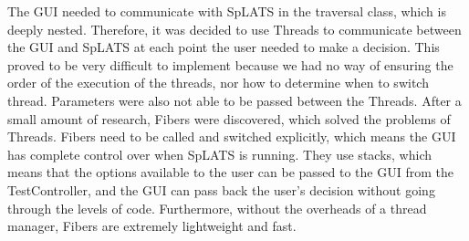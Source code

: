     The GUI needed to communicate with SpLATS in the traversal class, which is deeply nested. Therefore, it was decided to use Threads to communicate between the GUI and SpLATS at each point the user needed to make a decision. This proved to be very difficult to implement because we had no way of ensuring the order of the execution of the threads, nor how to determine when to switch thread. Parameters were also not able to be passed between the Threads. After a small amount of research, Fibers were discovered, which solved the problems of Threads. Fibers need to be called and switched explicitly, which means the GUI has complete control over when SpLATS is running. They use stacks, which means that the options available to the user can be passed to the GUI from the TestController, and the GUI can pass back the user's decision without going through the levels of code. Furthermore, without the overheads of a thread manager, Fibers are extremely lightweight and fast.
